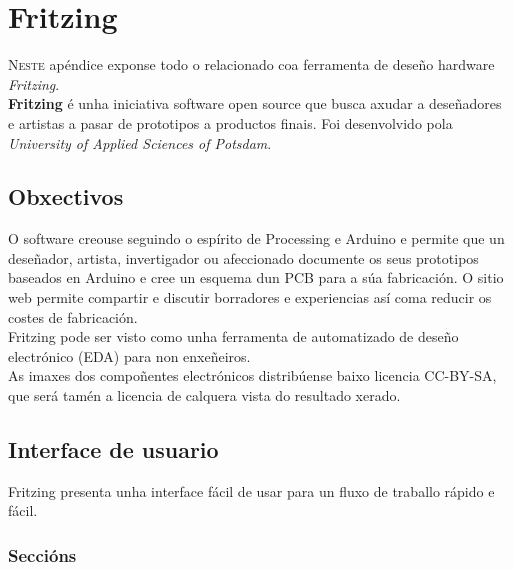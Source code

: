 \chapter{Fritzing}
\label{chap:fritzing}


\lettrine{N}{este} apéndice exponse todo o relacionado coa ferramenta de deseño
hardware \textit{Fritzing}. \\

\textbf{Fritzing} \cite{Fritzing} é unha iniciativa software open source que
busca axudar a deseñadores e artistas a pasar de prototipos a productos finais.
Foi desenvolvido pola \textit{University of Applied Sciences of Potsdam}.

\section{Obxectivos}

O software creouse seguindo o espírito de Processing e Arduino e permite que un
deseñador, artista, invertigador ou afeccionado documente os seus prototipos
baseados en Arduino e cree un esquema dun PCB para a súa fabricación. O sitio
web \cite{Fritzing} permite compartir e discutir borradores e experiencias así
coma reducir os costes de fabricación. \\

Fritzing pode ser visto como unha ferramenta de automatizado de deseño
electrónico (EDA) para non enxeñeiros. \\

As imaxes dos compoñentes electrónicos distribúense baixo licencia CC-BY-SA,
que será tamén a licencia de calquera vista do resultado xerado.

\section{Interface de usuario}

Fritzing presenta unha interface fácil de usar para un fluxo de traballo rápido
e fácil. \\

 \subsection{Seccións}

